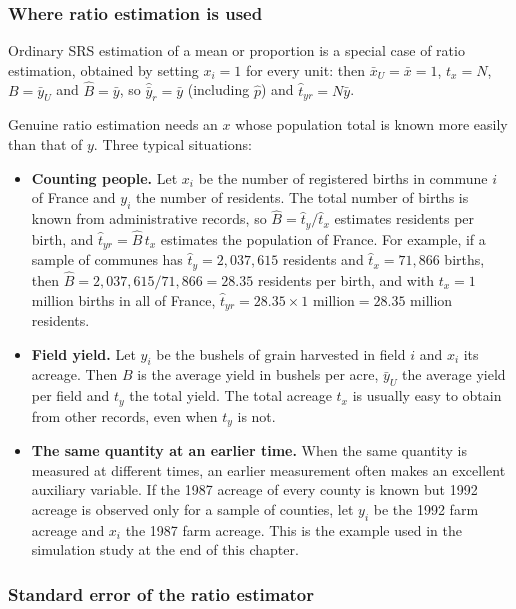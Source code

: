 \documentclass[
  letterpaper,
  DIV=11,
  numbers=noendperiod]{scrreprt}
\providecommand{\tightlist}{%
  \setlength{\itemsep}{0pt}\setlength{\parskip}{0pt}}
\renewcommand{\[}{\begin{equation}}
\renewcommand{\]}{\end{equation}}
\begin{document}
\subsubsection{Where ratio estimation is
used}\label{where-ratio-estimation-is-used}

Ordinary SRS estimation of a mean or proportion is a special case of
ratio estimation, obtained by setting \(x_i = 1\) for every unit: then
\(\bar x_U = \bar x = 1\), \(t_x = N\), \(B = \bar y_U\) and
\(\hat B = \bar y\), so \(\hat{\bar y}_r = \bar y\) (including
\(\hat p\)) and \(\hat t_{yr} = N\bar y\).

Genuine ratio estimation needs an \(x\) whose population total is known
more easily than that of \(y\). Three typical situations:

\begin{itemize}
\tightlist
\item
  \textbf{Counting people.} Let \(x_i\) be the number of registered
  births in commune \(i\) of France and \(y_i\) the number of residents.
  The total number of births is known from administrative records, so
  \(\hat B = \hat t_y/\hat t_x\) estimates residents per birth, and
  \(\hat t_{yr} = \hat B\,t_x\) estimates the population of France. For
  example, if a sample of communes has \(\hat t_y = 2{,}037{,}615\)
  residents and \(\hat t_x = 71{,}866\) births, then
  \(\hat B = 2{,}037{,}615/71{,}866 = 28.35\) residents per birth, and
  with \(t_x = 1\) million births in all of France,
  \(\hat t_{yr} = 28.35 \times 1\text{ million} = 28.35\) million
  residents.
\item
  \textbf{Field yield.} Let \(y_i\) be the bushels of grain harvested in
  field \(i\) and \(x_i\) its acreage. Then \(B\) is the average yield
  in bushels per acre, \(\bar y_U\) the average yield per field and
  \(t_y\) the total yield. The total acreage \(t_x\) is usually easy to
  obtain from other records, even when \(t_y\) is not.
\item
  \textbf{The same quantity at an earlier time.} When the same quantity
  is measured at different times, an earlier measurement often makes an
  excellent auxiliary variable. If the 1987 acreage of every county is
  known but 1992 acreage is observed only for a sample of counties, let
  \(y_i\) be the 1992 farm acreage and \(x_i\) the 1987 farm acreage.
  This is the example used in the simulation study at the end of this
  chapter.
\end{itemize}

\subsubsection{Standard error of the ratio
estimator}\label{standard-error-of-the-ratio-estimator}
\end{document}
